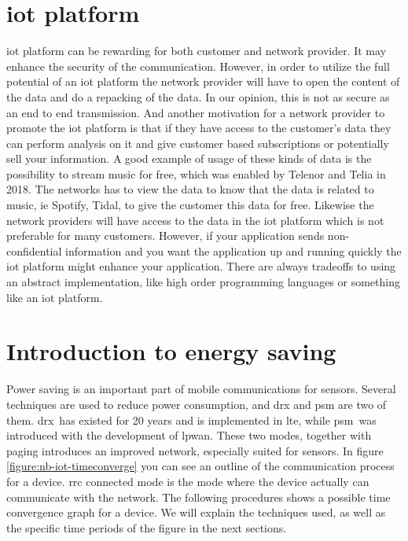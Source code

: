 \documentclass[USenglish]{ifimaster}  %
\begin{document}
\section{\acrshort{iot} platform} \label{section:iotplatform}
\acrshort{iot} platform can be rewarding for both customer and network provider. It may enhance the security of the communication. However, in order to utilize the full potential of an \acrshort{iot} platform the network provider will have to open the content of the data and do a repacking of the data. In our opinion, this is not as secure as an end to end transmission. And another motivation for a network provider to promote the \acrshort{iot} platform is that if they have access to the customer's data they can perform analysis on it and give customer based subscriptions or potentially sell your information. A good example of usage of these kinds of data is the possibility to stream music for free, which was enabled by Telenor and Telia in 2018. The networks has to view the data to know that the data is related to music, ie Spotify, Tidal, to give the customer this data for free. Likewise the network providers will have access to the data in the \acrshort{iot} platform which is not preferable for many customers. However, if your application sends non-confidential information and you want the application up and running quickly the \acrshort{iot} platform might enhance your application. There are always tradeoffs to using an abstract implementation, like high order programming languages or something like an \acrshort{iot} platform.

\section{Introduction to energy saving} \label{section:energysaving}
Power saving is an important part of mobile communications for sensors. Several techniques are used to reduce power consumption, and \acrfull{drx} and \acrfull{psm} are two of them. \acrshort{drx} has existed for 20 years and is implemented in \acrshort{lte}, while \acrshort{psm} was introduced with the development of \acrshort{lpwan}. These two modes, together with paging introduces an improved network, especially suited for sensors. In figure \vref{figure:nb-iot-timeconverge} you can see an outline of the communication process for a device. \acrfull{rrc} connected mode is the mode where the device actually can communicate with the network. The following procedures shows a possible time convergence graph for a device. We will explain the techniques used, as well as the specific time periods of the figure in the next sections.
\end{document}
